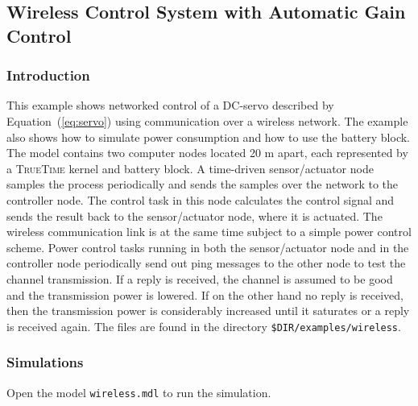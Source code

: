 \documentclass[final,twoside]{rapport}
\begin{document}
\vspace{1em}
\subsection{Wireless Control System with Automatic Gain Control}
\label{sec:wireless}

\subsubsection{Introduction}
This example shows networked control of a DC-servo described by
Equation~(\ref{eq:servo}) using
communication over a wireless network. The example also shows how to
simulate power consumption and how to use the battery block. The model
contains two computer nodes located 20 m apart, each represented by a
\textsc{TrueTime} kernel and battery block. A time-driven sensor/actuator node samples the
process periodically and sends the samples over the network to the
controller node. The control task in this node calculates the control
signal and sends the result back to the sensor/actuator node, where it
is actuated. The wireless communication link is at the same time
subject to a simple power control scheme. Power control tasks running
in both the sensor/actuator node and in the controller node
periodically send out ping messages to the other node to test the
channel transmission. If a reply is received, the channel is assumed
to be good and the transmission power is lowered. If on the other hand
no reply is received, then the transmission power is considerably
increased until it saturates or a reply is received again. The files
are found in the directory \texttt{\$DIR/examples/wireless}.

\subsubsection{Simulations}
Open the model \texttt{wireless.mdl} to run the simulation. 
\end{document}
